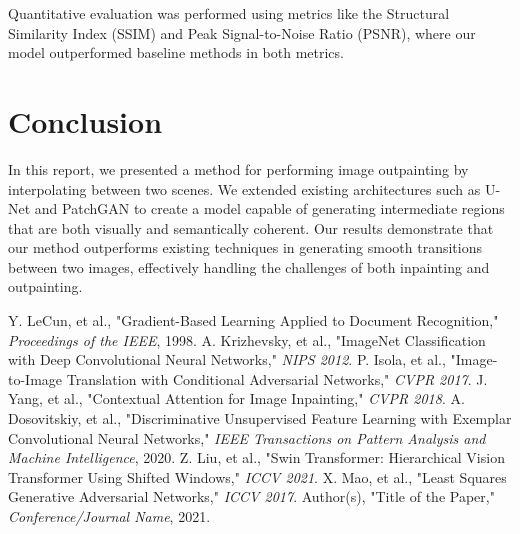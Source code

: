 \documentclass[sigconf]{acmart}
\begin{document}
Quantitative evaluation was performed using metrics like the Structural Similarity Index (SSIM) and Peak Signal-to-Noise Ratio (PSNR), where our model outperformed baseline methods in both metrics.

\section*{Conclusion}
In this report, we presented a method for performing image outpainting by interpolating between two scenes. We extended existing architectures such as U-Net and PatchGAN to create a model capable of generating intermediate regions that are both visually and semantically coherent. Our results demonstrate that our method outperforms existing techniques in generating smooth transitions between two images, effectively handling the challenges of both inpainting and outpainting.

\begin{thebibliography}{9}
     Y. LeCun, et al., "Gradient-Based Learning Applied to Document Recognition," \textit{Proceedings of the IEEE}, 1998.
     A. Krizhevsky, et al., "ImageNet Classification with Deep Convolutional Neural Networks," \textit{NIPS 2012}.
     P. Isola, et al., "Image-to-Image Translation with Conditional Adversarial Networks," \textit{CVPR 2017}.
     J. Yang, et al., "Contextual Attention for Image Inpainting," \textit{CVPR 2018}.
     A. Dosovitskiy, et al., "Discriminative Unsupervised Feature Learning with Exemplar Convolutional Neural Networks," \textit{IEEE Transactions on Pattern Analysis and Machine Intelligence}, 2020.
     Z. Liu, et al., "Swin Transformer: Hierarchical Vision Transformer Using Shifted Windows," \textit{ICCV 2021}.
     X. Mao, et al., "Least Squares Generative Adversarial Networks," \textit{ICCV 2017}.
     Author(s), "Title of the Paper," \textit{Conference/Journal Name}, 2021.
\end{thebibliography}
\end{document}
